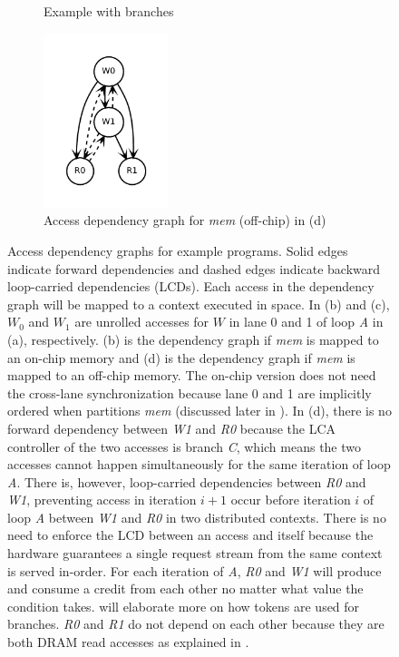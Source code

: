 \begin{figure}
\begin{subfigure}[b]{0.4\textwidth}
\inputminted{python}{code/dep3.py}
\caption{Example with branches}
\end{subfigure}
\begin{subfigure}[b]{0.5\textwidth}
  \centering
\includegraphics[width=0.4\textwidth]{figs/dep3.pdf}
  \caption{Access dependency graph for \emph{mem} (off-chip) in (d)}
\end{subfigure}

\caption[Access dependency graph]{
  Access dependency graphs for example programs. 
  Solid edges indicate forward dependencies and
  dashed edges indicate backward loop-carried dependencies (LCDs).
  Each access in the dependency graph will be mapped to a context executed in space. 
  In (b) and (c),
  \emph{$W_0$} and \emph{$W_1$} are unrolled accesses for $W$ in lane 0 and 1 of loop \emph{A}
  in (a), respectively.
  (b) is the dependency graph if \emph{mem} is mapped to an on-chip memory and (d)
  is the dependency graph if \emph{mem} is mapped to an off-chip memory.
  The on-chip version does not need the cross-lane synchronization because 
  lane 0 and 1 are implicitly ordered when \name partitions \emph{mem} 
  (discussed later in ).
  In (d), there is no forward dependency between \emph{W1} and \emph{R0} because the LCA controller
  of the two accesses is branch \emph{C}, which means the two accesses cannot happen simultaneously 
  for the same iteration of loop \emph{A}.
  There is, however, loop-carried dependencies between \emph{R0} and \emph{W1}, preventing access
  in iteration $i+1$ occur before iteration $i$ of loop \emph{A} between \emph{W1} and \emph{R0} in
  two distributed contexts.
  There is no need to enforce the LCD between an access and itself because 
  the hardware guarantees a single request stream from the same context is served in-order.
  For each iteration of \emph{A}, \emph{R0} and \emph{W1} will produce and consume a credit from
  each other no matter what value the condition takes. 
   will elaborate more on how tokens are used for branches.
  \emph{R0} and \emph{R1} do not depend on each other because they are both DRAM read accesses as explained in .
}
\label{fig:depeg}
\end{figure}

